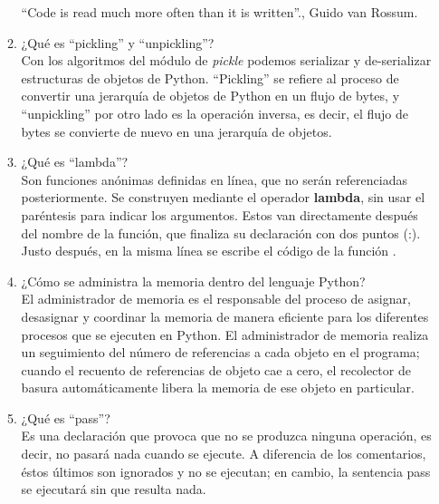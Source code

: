\documentclass[a4paper,openright,12pt]{report}
\begin{document}
\begin{itemize}
\begin{enumerate}
			
			``Code is read much more often than it is written''., Guido van Rossum.\\
			
			\item ¿Qué es ``pickling'' y ``unpickling''? \\
			
			Con los algoritmos del módulo de \textit{pickle} podemos serializar y de-serializar estructuras de objetos de Python. ``Pickling'' se refiere al proceso de convertir una jerarquía de objetos de Python en un flujo de bytes, y  ``unpickling'' por otro lado es la operación inversa, es decir, el flujo de bytes se convierte de nuevo en una jerarquía de objetos.\\
			
			
			\item ¿Qué es  ``lambda''? \\
			
			Son funciones anónimas definidas en línea, que no serán referenciadas posteriormente. Se construyen mediante el operador \textbf{lambda}, sin usar el paréntesis para indicar los argumentos. Estos van directamente después del nombre de la función, que finaliza su declaración con dos puntos (:). Justo después, en la misma línea se escribe el código de la función \cite{rodolenguaje}.\\
			
			\item ¿Cómo se administra la memoria dentro del lenguaje Python? \\
			
			El administrador de memoria es el responsable del proceso de asignar, desasignar y coordinar la memoria de manera eficiente para los diferentes procesos que se ejecuten en Python. El administrador de memoria realiza un seguimiento del número de referencias a cada objeto en el programa; cuando el recuento de referencias de objeto cae a cero, el recolector de basura automáticamente libera la memoria de ese objeto en particular.\\
			
			
			\item ¿Qué es ``pass''? \\
			
			Es una declaración que provoca que no se produzca ninguna operación, es decir, no pasará nada cuando se ejecute. A diferencia de los comentarios, éstos últimos son ignorados y no se ejecutan; en cambio, la sentencia pass se ejecutará sin que resulta nada.\\
			

\end{enumerate}
\end{itemize}
\end{document}
